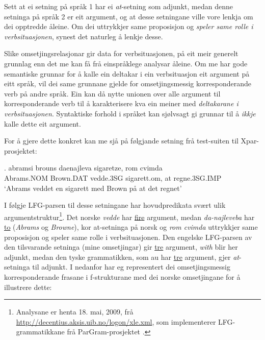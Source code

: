 \documentclass[11pt,a4paper,oneside,draft]{book}
\begin{document}
Sett at ei setning på språk 1 har ei \emph{at}-setning som adjunkt, medan
denne setninga på språk 2 er eit argument, og at desse setningane
ville vore lenkja om dei opptredde åleine. Om dei uttrykkjer same
proposisjon og \emph{speler same rolle i verbsituasjonen}, synest det
naturleg å lenkje desse.

Slike omsetjingsrelasjonar gir data for verbsituasjonen, på eit meir
generelt grunnlag enn det me kan få frå einspråklege analysar
åleine. Om me har gode semantiske grunnar for å kalle ein deltakar i
ein verbsituasjon eit argument på eitt språk, vil dei same grunnane
gjelde for omsetjingsmessig korresponderande verb på andre språk. Ein
kan då nytte unionen over alle argument til korresponderande verb til
å karakterisere kva ein meiner med \emph{deltakarane i verbsituasjonen}. Syntaktiske forhold i språket kan sjølvsagt gi
grunnar til å \emph{ikkje} kalle dette eit argument.

For å gjere dette konkret kan me sjå på følgjande setning frå
test-suiten til Xpar-prosjektet:

\exg. abramsi brouns       daenajleva sigaretze, rom cvimda \label{ex:vedde-gloss} \\
      Abrams.NOM Brown.DAT vedde.3SG sigarett.om, at  regne.3SG.IMP \\
     `Abrams veddet en sigarett med Brown på at det regnet' 

I følgje LFG-parsen til desse setningane har hovudpredikata svært ulik
argumentstruktur\footnote{Analysane er henta 18. mai, 2009, frå
        \href{http://decentius.aksis.uib.no/logon/xle.xml}{http://decentius.aksis.uib.no/logon/xle.xml}, som implementerer
        LFG-grammatikkane frå ParGram-prosjektet \citep{butt2002pgp}. }. Det norske \emph{vedde} har \underline{fire} argument, medan
\emph{da-najleveba} har \underline{to} (\emph{Abrams} og \emph{Browne}), kor at-setninga på
norsk og \emph{rom cvimda} uttrykkjer same proposisjon og speler same rolle
i verbsituasjonen. Den engelske LFG-parsen av den tilsvarande setninga
(mine omsetjingar) gir \underline{tre} argument, \emph{with} blir her adjunkt, medan
den tyske grammatikken, som au har \underline{tre} argument, gjer \emph{at}-setninga
til adjunkt. I \Next nedanfor har eg representert dei omsetjingsmessig
korresponderande frasane i f-strukturane med dei norske omsetjingane
for å illustrere dette:
\end{document}
